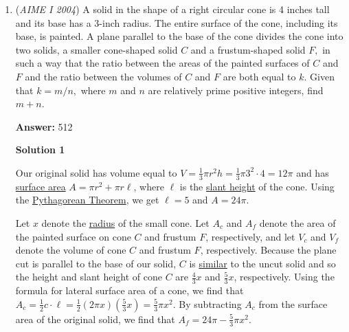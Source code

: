 \begin{enumerate}
 This yields $c=\frac{13}{12}$.

 \href{https://mathproblemsolvingskills.wordpress.com/}{MathProblemSolvingSkills.com}

 


 


	\item (\textit{AIME I 2004}) A solid in the shape of a right circular cone is 4 inches tall and its base has a 3-inch radius. The entire surface of the cone, including its base, is painted. A plane parallel to the base of the cone divides the cone into two solids, a smaller cone-shaped solid $C$ and a frustum-shaped solid $F,$ in such a way that the ratio between the areas of the painted surfaces of $C$ and $F$ and the ratio between the volumes of $C$ and $F$ are both equal to $k.$ Given that $k=m/n,$ where $m$ and $n$ are relatively prime positive integers, find $m+n.$

 \textbf{Answer: }512



\textbf{Solution 1}

Our original solid has volume equal to $V = \frac13 \pi r^2 h = \frac13 \pi 3^2\cdot 4 = 12 \pi$ and has \href{https://artofproblemsolving.com/wiki/index.php?title=Surface\_area}{surface area} $A = \pi r^2 + \pi r \ell$, where $\ell$ is the \href{https://artofproblemsolving.com/wiki/index.php?title=Slant\_height}{slant height} of the cone.  Using the \href{https://artofproblemsolving.com/wiki/index.php?title=Pythagorean\_Theorem}{Pythagorean Theorem}, we get $\ell = 5$ and $A = 24\pi$.

 Let $x$ denote the \href{https://artofproblemsolving.com/wiki/index.php?title=Radius}{radius} of the small cone. Let $A_c$ and $A_f$ denote the area of the painted surface on cone $C$ and frustum $F$, respectively, and let $V_c$ and $V_f$ denote the volume of cone $C$ and frustum $F$, respectively.  Because the plane cut is parallel to the base of our solid, $C$ is \href{https://artofproblemsolving.com/wiki/index.php?title=Similar}{similar} to the uncut solid and so the height and slant height of cone $C$ are $\frac{4}{3}x$ and $\frac{5}{3}x$, respectively. Using the formula for lateral surface area of a cone, we find that $A_c=\frac{1}{2}c\cdot \ell=\frac{1}{2}(2\pi x)\left(\frac{5}{3}x\right)=\frac{5}{3}\pi x^2$. By subtracting $A_c$ from the surface area of the original solid, we find that $A_f=24\pi - \frac{5}{3}\pi x^2$. 


\end{enumerate}
